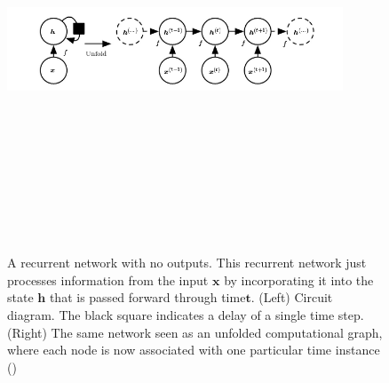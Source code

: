 \begin{enumerate}
\begin{figure}[H]
		\includegraphics[width=10cm,height=12cm,keepaspectratio]{files/recurrentNN.png}
		\caption{A recurrent network with no outputs. This recurrent network just processes information from the input $\mathbf{x}$ by incorporating it into the state $\mathbf{h}$ that is passed forward through time$\mathbf{t}$. (Left) Circuit diagram. The black square indicates a delay of a single time step. (Right) The same network seen as an unfolded computational graph, where each node is now associated with one particular time instance (\cite{Goodfellow-et-al-2016})}
		\label{fig:fnn}
	\end{figure}
\end{enumerate}
